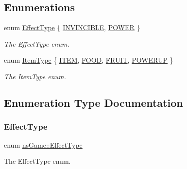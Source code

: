 \subsection*{Enumerations}
\begin{DoxyCompactItemize}
\item 
enum \hyperlink{namespacens_game_afea521dd2ba8e97be9549ce9936f4522}{Effect\+Type} \{ \hyperlink{namespacens_game_afea521dd2ba8e97be9549ce9936f4522ad8419bc5aa898e494274288a9ac80024}{I\+N\+V\+I\+N\+C\+I\+B\+LE}, 
\hyperlink{namespacens_game_afea521dd2ba8e97be9549ce9936f4522a3fb98417363f58fdca3c1736cb2bc524}{P\+O\+W\+ER}
 \}\begin{DoxyCompactList}\small\item\em The Effect\+Type enum. \end{DoxyCompactList}
\item 
enum \hyperlink{namespacens_game_a5f7db01e6447720e9a145f0b3c68a4d7}{Item\+Type} \{ \hyperlink{namespacens_game_a5f7db01e6447720e9a145f0b3c68a4d7af9fff3d8a5eecce5e7a5832384af32c7}{I\+T\+EM}, 
\hyperlink{namespacens_game_a5f7db01e6447720e9a145f0b3c68a4d7a4854f9b87edf18fbc6f4e3b5203e82fe}{F\+O\+OD}, 
\hyperlink{namespacens_game_a5f7db01e6447720e9a145f0b3c68a4d7a11fef96488a5f7c7890a7e4a55c44ec9}{F\+R\+U\+IT}, 
\hyperlink{namespacens_game_a5f7db01e6447720e9a145f0b3c68a4d7a8f64a06aec54275dc5b48f16ed3434d2}{P\+O\+W\+E\+R\+UP}
 \}\begin{DoxyCompactList}\small\item\em The Item\+Type enum. \end{DoxyCompactList}
\end{DoxyCompactItemize}


\subsection{Enumeration Type Documentation}
\mbox{\label{namespacens_game_afea521dd2ba8e97be9549ce9936f4522}} 
\subsubsection{\texorpdfstring{Effect\+Type}{EffectType}}
{\footnotesize\ttfamily enum \hyperlink{namespacens_game_afea521dd2ba8e97be9549ce9936f4522}{ns\+Game\+::\+Effect\+Type}}



The Effect\+Type enum. 

